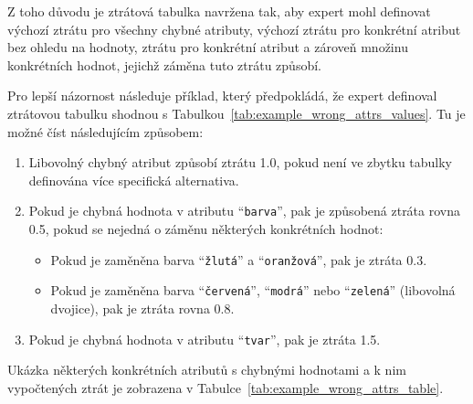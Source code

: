 Z toho důvodu je ztrátová tabulka navržena tak, aby expert mohl definovat výchozí ztrátu pro všechny chybné atributy,
výchozí ztrátu pro konkrétní atribut bez ohledu na hodnoty, ztrátu pro konkrétní atribut a zároveň množinu konkrétních hodnot, jejichž záměna tuto ztrátu způsobí.

Pro lepší názornost následuje příklad, který předpokládá, že expert definoval ztrátovou tabulku shodnou s Tabulkou~\ref{tab:example_wrong_attrs_values}.
Tu je možné číst následujícím způsobem:
\begin{enumerate}
	\item Libovolný chybný atribut způsobí ztrátu 1.0, pokud není ve zbytku tabulky definována více specifická alternativa.
	\item Pokud je chybná hodnota v atributu \enquote{\texttt{barva}}, pak je způsobená ztráta rovna 0.5, pokud se nejedná o záměnu některých konkrétních hodnot:
	      \begin{itemize}
		      \item Pokud je zaměněna barva \enquote{\texttt{žlutá}} a \enquote{\texttt{oranžová}}, pak je ztráta 0.3.
		      \item Pokud je zaměněna barva \enquote{\texttt{červená}}, \enquote{\texttt{modrá}} nebo \enquote{\texttt{zelená}} (libovolná dvojice), pak je ztráta rovna 0.8.
	      \end{itemize}
	\item Pokud je chybná hodnota v atributu \enquote{\texttt{tvar}}, pak je ztráta 1.5.
\end{enumerate}
Ukázka některých konkrétních atributů s chybnými hodnotami a k nim vypočtených ztrát je zobrazena v Tabulce~\ref{tab:example_wrong_attrs_table}.

